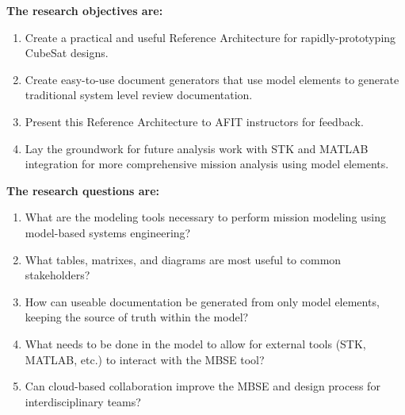
\noindent \textbf{The research objectives are:}

\begin{enumerate}
\item{Create a practical and useful Reference Architecture for rapidly-prototyping CubeSat designs.}
\item{Create easy-to-use document generators that use model elements to generate traditional system level review documentation.}
\item{Present this Reference Architecture to AFIT instructors for feedback.}
\item{Lay the groundwork for future analysis work with STK and MATLAB integration for more comprehensive mission analysis using model elements.}
\end{enumerate}



\noindent \textbf{The research questions are:}

\begin{enumerate}
\item{What are the modeling tools necessary to perform mission modeling using model-based systems engineering?}
\item{What tables, matrixes, and diagrams are most useful to common stakeholders?}
\item{How can useable documentation be generated from only model elements, keeping the source of truth within the model?}
\item{What needs to be done in the model to allow for external tools (STK, MATLAB, etc.) to interact with the MBSE tool?}
\item{Can cloud-based collaboration improve the MBSE and design process for interdisciplinary teams?}

\end{enumerate}